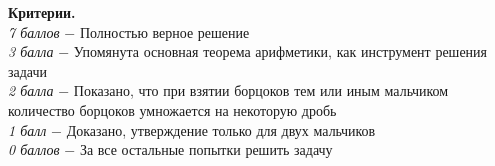 \textbf{Критерии.} \\
\textit{7 баллов} $-$ Полностью верное решение \\
\textit{3 балла} $-$ Упомянута основная теорема арифметики, как инструмент решения задачи\\
\textit{2 балла} $-$ Показано, что при взятии борцоков тем или иным мальчиком количество борцоков умножается на некоторую дробь\\
\textit{1 балл} $-$  Доказано, утверждение только для двух мальчиков \\ 
\textit{0 баллов} $-$ За все остальные попытки решить задачу\\